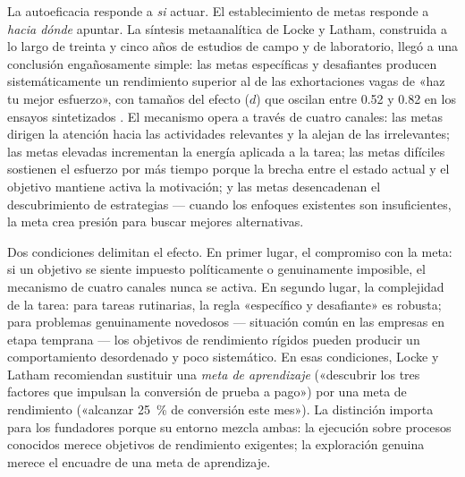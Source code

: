 La autoeficacia responde a \emph{si} actuar. El establecimiento de metas responde a \emph{hacia
dónde} apuntar. La síntesis metaanalítica de Locke y Latham, construida a lo largo de treinta y
cinco años de estudios de campo y de laboratorio, llegó a una conclusión engañosamente simple:
las metas específicas y desafiantes producen sistemáticamente un rendimiento superior al de las
exhortaciones vagas de «haz tu mejor esfuerzo», con tamaños del efecto ($d$) que oscilan entre
\num{0.52} y \num{0.82} en los ensayos sintetizados \parencite{locke2002building}. El mecanismo
opera a través de cuatro canales: las metas dirigen la atención hacia las actividades relevantes
y la alejan de las irrelevantes; las metas elevadas incrementan la energía aplicada a la tarea;
las metas difíciles sostienen el esfuerzo por más tiempo porque la brecha entre el estado actual
y el objetivo mantiene activa la motivación; y las metas desencadenan el descubrimiento de
estrategias --- cuando los enfoques existentes son insuficientes, la meta crea presión para buscar
mejores alternativas.

Dos condiciones delimitan el efecto. En primer lugar, el compromiso con la meta: si un objetivo
se siente impuesto políticamente o genuinamente imposible, el mecanismo de cuatro canales nunca
se activa. En segundo lugar, la complejidad de la tarea: para tareas rutinarias, la regla
«específico y desafiante» es robusta; para problemas genuinamente novedosos --- situación común
en las empresas en etapa temprana --- los objetivos de rendimiento rígidos pueden producir un
comportamiento desordenado y poco sistemático. En esas condiciones, Locke y Latham recomiendan
sustituir una \emph{meta de aprendizaje} («descubrir los tres factores que impulsan la
conversión de prueba a pago») por una meta de rendimiento («alcanzar \qty{25}{\percent} de
conversión este mes»). La distinción importa para los fundadores porque su entorno mezcla
ambas: la ejecución sobre procesos conocidos merece objetivos de rendimiento exigentes; la
exploración genuina merece el encuadre de una meta de aprendizaje.

